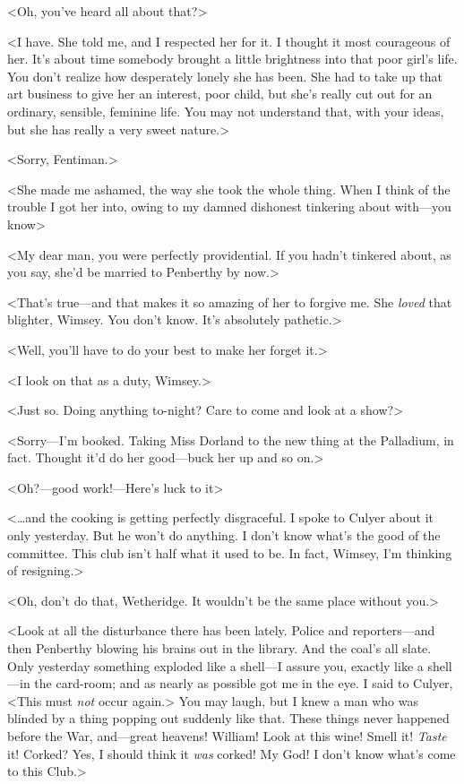 <Oh, you've heard all about that?>

<I have. She told me, and I respected her for it. I thought it most courageous of her. It's about time somebody brought a little brightness into that poor girl's life. You don't realize how desperately lonely she has been. She had to take up that art business to give her an interest, poor child, but she's really cut out for an ordinary, sensible, feminine life. You may not understand that, with your ideas, but she has really a very sweet nature.>

<Sorry, Fentiman.>

<She made me ashamed, the way she took the whole thing. When I think of the trouble I got her into, owing to my damned dishonest tinkering about with—you know\longdash>

<My dear man, you were perfectly providential. If you hadn't tinkered about, as you say, she'd be married to Penberthy by now.>

<That's true—and that makes it so amazing of her to forgive me. She \emph{loved} that blighter, Wimsey. You don't know. It's absolutely pathetic.>

<Well, you'll have to do your best to make her forget it.>

<I look on that as a duty, Wimsey.>

<Just so. Doing anything to-night? Care to come and look at a show?>

<Sorry—I'm booked. Taking Miss Dorland to the new thing at the Palladium, in fact. Thought it'd do her good—buck her up and so on.>

<Oh?—good work!—Here's luck to it\longdots>

<\dots and the cooking is getting perfectly disgraceful. I spoke to Culyer about it only yesterday. But he won't do anything. I don't know what's the good of the committee. This club isn't half what it used to be. In fact, Wimsey, I'm thinking of resigning.>

<Oh, don't do that, Wetheridge. It wouldn't be the same place without you.>

<Look at all the disturbance there has been lately. Police and reporters—and then Penberthy blowing his brains out in the library. And the coal's all slate. Only yesterday something exploded like a shell—I assure you, exactly like a shell—in the card-room; and as nearly as possible got me in the eye. I said to Culyer, <This must \emph{not} occur again.> You may laugh, but I knew a man who was blinded by a thing popping out suddenly like that. These things never happened before the War, and—great heavens! William! Look at this wine! Smell it! \emph{Taste} it! Corked? Yes, I should think it \emph{was} corked! My God! I don't know what's come to this Club.>
